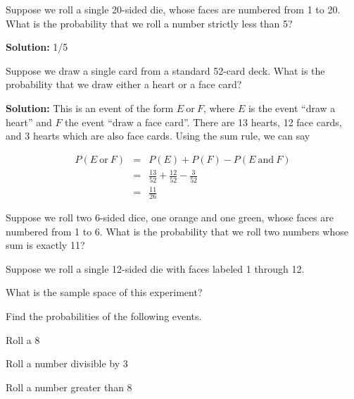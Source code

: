 \documentclass{article}
\begin{document}
\ActivityTitle[class=Statistics, number=2, name={Probability (Solutions)}]

\begin{enumerate}
\item Suppose we roll a single 20-sided die, whose faces are numbered from 1 to 20. What is the probability that we roll a number strictly less than 5?

\textbf{Solution:} 1/5


  
\vspace{1cm}

\item Suppose we draw a single card from a standard 52-card deck. What is the probability that we draw either a heart or a face card?

\textbf{Solution:} This is an event of the form $E \ \mathrm{or}\ F$, where $E$ is the event ``draw a heart'' and $F$ the event ``draw a face card''. There are 13 hearts, 12 face cards, and 3 hearts which are also face cards. Using the sum rule, we can say

\begin{eqnarray*}
P(E \ \mathrm{or}\ F) & = & P(E) + P(F) - P(E \ \mathrm{and}\ F) \\
 & = & \frac{13}{52} + \frac{12}{52} - \frac{3}{52} \\
 & = & \frac{11}{26}
\end{eqnarray*}


  
\vspace{1cm}

\item Suppose we roll two 6-sided dice, one orange and one green, whose faces are numbered from 1 to 6. What is the probability that we roll two numbers whose sum is exactly 11?

  
\vspace{1cm}

\item Suppose we roll a single 12-sided die with faces labeled 1 through 12.

\begin{enumerate*}
\item What is the sample space of this experiment?
\item Find the probabilities of the following events.
\begin{enumerate*}
\item Roll a 8
\item Roll a number divisible by 3
\item Roll a number greater than 8
\end{enumerate*}
\end{enumerate*}


\end{enumerate}
\end{document}
